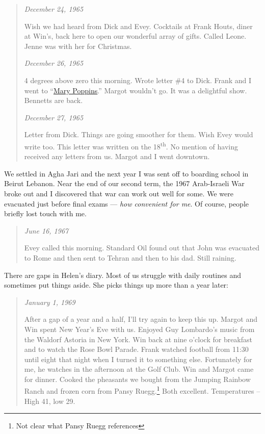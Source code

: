 \begin{quote}
\emph{December 24, 1965}

Wish we had heard from Dick and Evey. Cocktails at Frank Houts, diner at
Win's, back here to open our wonderful array of gifts. Called Leone.
Jenne was with her for Christmas.

\emph{December 26, 1965}

4 degrees above zero this morning. Wrote letter \#4 to Dick. Frank and I
went to ``\href{https://en.wikipedia.org/wiki/Mary_Poppins_(film)}{Mary
Poppins}.'' Margot wouldn't go. It was a delightful show. Bennetts are
back.

\emph{December 27, 1965}

Letter from Dick. Things are going smoother for them. Wish Evey would
write too. This letter was written on the 18\textsuperscript{th}. No
mention of having received any letters from us. Margot and I went
downtown.
\end{quote}

We settled in Agha Jari and the next year I was sent off to boarding
school in Beirut Lebanon. Near the end of our second term, the 1967
Arab-Israeli War broke out and I discovered that war can work out well
for some. We were evacuated just before final exams --- \emph{how
convenient for me}. Of course, people briefly lost touch with me.

\begin{quote}
\emph{June 16, 1967}

Evey called this morning. Standard Oil found out that John was evacuated
to Rome and then sent to Tehran and then to his dad. Still raining.
\end{quote}

There are gaps in Helen's diary. Most of us struggle with daily routines
and sometimes put things aside. She picks things up more than a year
later:

\begin{quote}
\emph{January 1, 1969}

After a gap of a year and a half, I'll try again to keep this up. Margot
and Win spent New Year's Eve with us. Enjoyed Guy Lombardo's music from
the Waldorf Astoria in New York. Win back at nine o'clock for breakfast
and to watch the Rose Bowl Parade. Frank watched football from 11:30
until eight that night when I turned it to something else. Fortunately
for me, he watches in the afternoon at the Golf Club. Win and Margot
came for dinner. Cooked the pheasants we bought from the Jumping Rainbow
Ranch and frozen corn from Pansy
Ruegg.\footnote{Not clear what Pansy Ruegg references} Both excellent. Temperatures -- High 41, low 29.
\end{quote}


